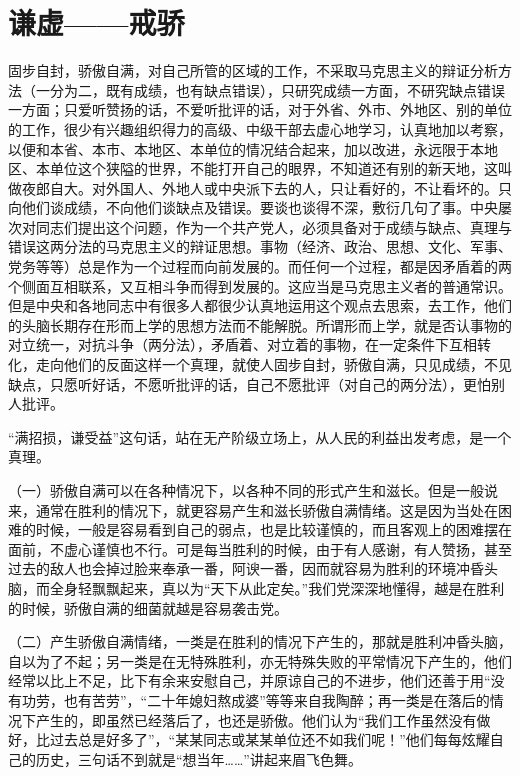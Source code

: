 \section[谦虚——戒骄（一九六三年十二月十三日）]{谦虚——戒骄}


固步自封，骄傲自满，对自己所管的区域的工作，不采取马克思主义的辩证分析方法（一分为二，既有成绩，也有缺点错误），只研究成绩一方面，不研究缺点错误一方面；只爱听赞扬的话，不爱听批评的话，对于外省、外市、外地区、别的单位的工作，很少有兴趣组织得力的高级、中级干部去虚心地学习，认真地加以考察，以便和本省、本市、本地区、本单位的情况结合起来，加以改进，永远限于本地区、本单位这个狭隘的世界，不能打开自己的眼界，不知道还有别的新天地，这叫做夜郎自大。对外国人、外地人或中央派下去的人，只让看好的，不让看坏的。只向他们谈成绩，不向他们谈缺点及错误。要谈也谈得不深，敷衍几句了事。中央屡次对同志们提出这个问题，作为一个共产党人，必须具备对于成绩与缺点、真理与错误这两分法的马克思主义的辩证思想。事物（经济、政治、思想、文化、军事、党务等等）总是作为一个过程而向前发展的。而任何一个过程，都是因矛盾着的两个侧面互相联系，又互相斗争而得到发展的。这应当是马克思主义者的普通常识。但是中央和各地同志中有很多人都很少认真地运用这个观点去思索，去工作，他们的头脑长期存在形而上学的思想方法而不能解脱。所谓形而上学，就是否认事物的对立统一，对抗斗争（两分法），矛盾着、对立着的事物，在一定条件下互相转化，走向他们的反面这样一个真理，就使人固步自封，骄傲自满，只见成绩，不见缺点，只愿听好话，不愿听批评的话，自己不愿批评（对自己的两分法），更怕别人批评。

“满招损，谦受益”这句话，站在无产阶级立场上，从人民的利益出发考虑，是一个真理。

（一）骄傲自满可以在各种情况下，以各种不同的形式产生和滋长。但是一般说来，通常在胜利的情况下，就更容易产生和滋长骄傲自满情绪。这是因为当处在困难的时候，一般是容易看到自己的弱点，也是比较谨慎的，而且客观上的困难摆在面前，不虚心谨慎也不行。可是每当胜利的时候，由于有人感谢，有人赞扬，甚至过去的敌人也会掉过脸来奉承一番，阿谀一番，因而就容易为胜利的环境冲昏头脑，而全身轻飘飘起来，真以为“天下从此定矣。”我们党深深地懂得，越是在胜利的时候，骄傲自满的细菌就越是容易袭击党。

（二）产生骄傲自满情绪，一类是在胜利的情况下产生的，那就是胜利冲昏头脑，自以为了不起；另一类是在无特殊胜利，亦无特殊失败的平常情况下产生的，他们经常以比上不足，比下有余来安慰自己，并原谅自己的不进步，他们还善于用“没有功劳，也有苦劳”，“二十年媳妇熬成婆”等等来自我陶醉；再一类是在落后的情况下产生的，即虽然已经落后了，也还是骄傲。他们认为“我们工作虽然没有做好，比过去总是好多了”，“某某同志或某某单位还不如我们呢！”他们每每炫耀自己的历史，三句话不到就是“想当年……”讲起来眉飞色舞。


